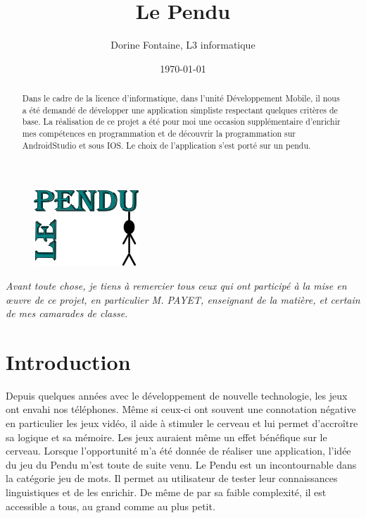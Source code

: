 \documentclass{article}
\title{Le Pendu}
\author{ Dorine Fontaine, L3 informatique}
\date{\today}
\begin{document}
\maketitle %
\begin{figure}[h!]
\centering
\includegraphics[scale=1]{logo.png}

\label{fig:menu}
\end{figure}



\begin{abstract}
 

Dans le cadre de la licence d'informatique, dans l'unité Développement Mobile, il nous a été demandé de développer une application simpliste respectant quelques critères de base. La réalisation de ce projet a été pour moi une occasion supplémentaire d'enrichir mes compétences en programmation et de découvrir la programmation sur AndroidStudio et sous IOS.
Le choix de l'application s'est porté sur un pendu.

\end{abstract}


\newpage
 \pagecolor{white}
  \color{black}

\fontsize{10pt}{10pt}
\textit{Avant toute chose, je tiens à remercier tous ceux qui ont participé à la mise en œuvre de ce projet, en particulier M. PAYET, enseignant de la matière, et certain de mes camarades de classe.
}
\vspace{10mm}
\tableofcontents





\newpage
\section{Introduction}
\label{section:intro} %

Depuis quelques années avec le développement de nouvelle technologie, les jeux ont envahi nos téléphones. Même si ceux-ci ont souvent une connotation négative en particulier les jeux vidéo, il aide à stimuler le cerveau et lui permet d'accroître sa logique et sa mémoire. Les jeux auraient même un effet bénéfique sur le cerveau. Lorsque l'opportunité m'a été donnée de réaliser une application, l'idée du jeu du Pendu m'est toute de suite venu. Le Pendu est un incontournable dans la catégorie jeu de mots. Il permet au utilisateur de tester leur connaissances linguistiques et de les enrichir. De même de par sa faible complexité, il est accessible a tous, au grand comme au plus petit.
\end{document}

